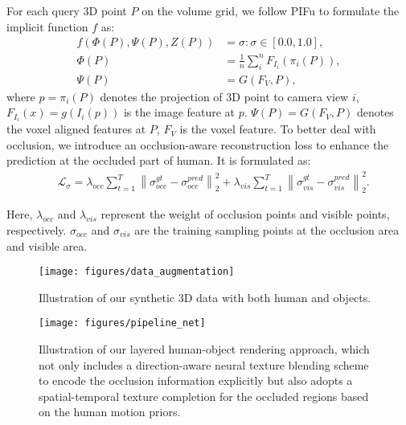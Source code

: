For each query 3D point $P$ on the volume grid, we follow PIFu \citep{saito2019pifu} to formulate the implicit function $f$ as:
\begin{align}
	f( \Phi(P),\Psi(P),Z(P)) & = \sigma : \sigma \in [0.0, 1.0],             \\
	\Phi(P)                  & = \frac{1}{n} \sum_{i}^{n}F_{I_{i}}(\pi_{i}(P)), \\
	\Psi(P)                  & =  G(F_{V},P),
\end{align}
where $p = \pi_{i}(P)$ denotes the projection of 3D point to camera view $i$, $F_{I_{i}}(x)= g(I_{i}(p))$ is the image feature at $p$.
%
$\Psi(P) = G(F_{V},P)$ denotes the voxel aligned features at $P$, $F_{V}$ is the voxel feature.
%
To better deal with occlusion, we introduce an occlusion-aware reconstruction loss to enhance the prediction at the occluded part of human.
% 
It is formulated as:
	\begin{align}
		 & \mathcal{L}_{\sigma} = \lambda_{occ}\sum_{t=1}^T \left\| \sigma_{occ}^{gt} - \sigma_{occ}^{pred} \right\|_2^2 + \lambda_{vis}\sum_{t=1}^T \left\| \sigma_{vis}^{gt} - \sigma_{vis}^{pred} \right\|_2^2.
	\end{align}

% 
Here, $\lambda_{occ}$ and $\lambda_{vis}$ represent the weight of occlusion points and visible points, respectively.
%
$\sigma_{occ}$ and $\sigma_{vis}$ are the training sampling points at the occlusion area and visible area.


\begin{figure}[t]
    \centering
    \texttt{[image: figures/data\_augmentation]}
    \vspace{-10pt}
    \caption{Illustration of our synthetic 3D data with both human and objects.}
    \vspace{-15pt}
    \label{fig:DataAugmentation}
\end{figure}

\begin{figure*}[t]
	\centering
	\texttt{[image: figures/pipeline\_net]}
	\caption{Illustration of our layered human-object rendering approach, which not only includes a direction-aware neural texture blending scheme to encode the occlusion information explicitly but also adopts a spatial-temporal texture completion for the occluded regions based on the human motion priors.}
	\vspace{-10pt}
	\label{fig:pipeline_net}
\end{figure*}

